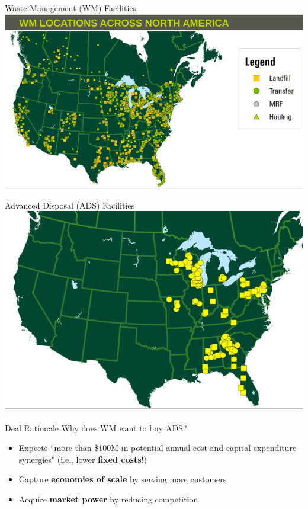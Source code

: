 \documentclass{beamer}
\begin{document}
\begin{frame}{Waste Management (WM) Facilities}
\includegraphics[width = \textwidth]{images/wmlocations.png}
\end{frame}

\begin{frame}{Advanced Disposal (ADS) Facilities}
\includegraphics[width = \textwidth]{images/adslocations.png}
\end{frame}

\begin{frame}{Deal Rationale}
Why does WM want to buy ADS?
\begin{itemize}
\item Expects ``more than \$100M in potential annual cost and capital expenditure synergies" (i.e., lower \textbf{fixed costs}!)
\item Capture \textbf{economies of scale} by serving more customers
\item Acquire \textbf{market power} by reducing competition
\end{itemize}
\end{frame}
\end{document}
